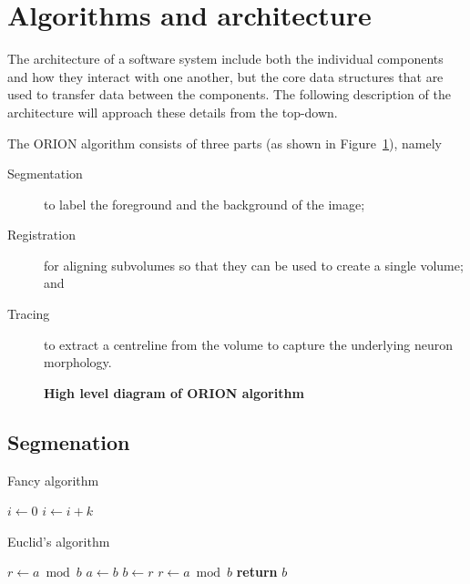 \section{Algorithms and architecture}

The architecture of a software system include both the individual
components and how they interact with one another, but the core
data structures that are used to transfer data between the
components. The following description of the architecture will
approach these details from the top-down.

The ORION algorithm consists of three parts (as shown in
Figure~\ref{fig:high-level-arch}), namely
\begin{description}
	\item[Segmentation] to label the
		foreground and the background of the image;
	\item[Registration] for aligning subvolumes so
		that they can be used to create a single volume;
		and
	\item[Tracing] to extract a centreline from the volume to
		capture the underlying neuron morphology.
\end{description}

\begin{figure}
\centering
\resizebox{1.0\textwidth}{!}{}
\caption[High level diagram of ORION algorithm]{\textbf{High level
diagram of ORION algorithm}}\label{fig:high-level-arch}
\end{figure}

\subsection{Segmenation}

\begin{algorithm}
\caption{Fancy algorithm}
\begin{algorithmic}[1]
    \State $i\gets 0$
\Else
        \State $i\gets i+k$
    \EndIf
\EndIf
\end{algorithmic}
\end{algorithm}

\begin{algorithm}
	\caption{Euclid’s algorithm}\label{euclid}
	\begin{algorithmic}[1]
		\State $r\gets a\bmod b$
			\State $a\gets b$
			\State $b\gets r$
			\State $r\gets a\bmod b$
		\EndWhile\label{euclidendwhile}
		\State \textbf{return} $b$
	\EndProcedure
	\end{algorithmic}
\end{algorithm}

